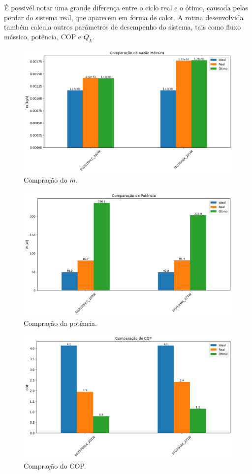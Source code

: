 É possivél notar uma grande diferença entre o ciclo real e o ótimo, causada pelas perdar do sistema real, que aparecem em forma de calor. A rotina desenvolvida também calcula outros parâmetros de desempenho do sistema, tais como fluxo mássico, potência, COP e ${Q_L}$.

\newpage

\begin{figure}[ht]
    \centering
    \includegraphics[width=0.8\linewidth]{Imagens/Desenvolvimento/barras_m.png}
    \caption{Compração do $\dot{m}$.}
    \label{fig:barras fluxo massa}
\end{figure}

\begin{figure}[ht]
    \centering
    \includegraphics[width=0.8\linewidth]{Imagens/Desenvolvimento/barras_W.png}
    \caption{Compração da potência.}
    \label{fig:barras W}
\end{figure}

\newpage

\begin{figure}[ht]
    \centering
    \includegraphics[width=0.8\linewidth]{Imagens/Desenvolvimento/barras_COP.png}
    \caption{Compração do COP.}
    \label{fig:barras COP}
\end{figure}


